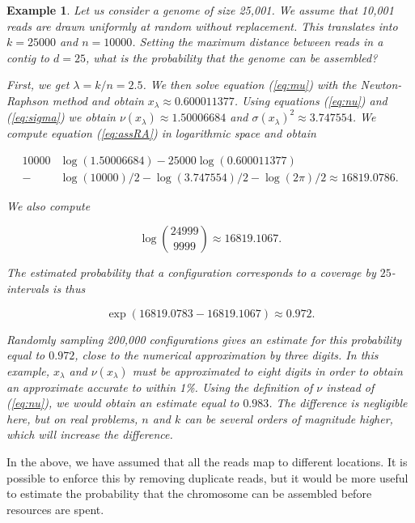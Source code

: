\documentclass{article}
\newtheorem{example}{Example}
\begin{document}
\begin{example}
Let us consider a genome of size 25,001. We assume that 10,001 reads are
drawn uniformly at random without replacement. This translates into
$k=25000$ and $n=10000$. Setting the maximum distance between reads in a
contig to $d=25$, what is the probability that the genome can be
assembled?

First, we get $\lambda = k/n = 2.5$. We then solve equation (\ref{eq:mu})
with the Newton-Raphson method and obtain $x_\lambda \approx 0.600011377$.
Using equations (\ref{eq:nu}) and (\ref{eq:sigma}) we obtain
$\nu(x_\lambda) \approx 1.50006684$ and $\sigma(x_\lambda)^2 \approx
3.747554$. We compute equation (\ref{eq:assRA}) in logarithmic space and
obtain

\begin{equation*}
\begin{split}
10000&\log(1.50006684) - 25000\log(0.600011377) \\
- &\log(10000)/2 - \log(3.747554)/2 - \log(2\pi)/2
\approx 16819.0786.
\end{split}
\end{equation*}

We also compute 

\begin{equation*}
\log { 24999 \choose 9999 } \approx 16819.1067.
\end{equation*}

The estimated probability that a configuration corresponds to a coverage
by $25$-intervals is thus

\begin{equation*}
\exp(16819.0783-16819.1067) \approx 0.972.
\end{equation*}

Randomly sampling 200,000 configurations gives an estimate for this
probability equal to $0.972$, close to the numerical approximation by
three digits. In this example, $x_\lambda$ and $\nu(x_\lambda)$ must be
approximated to eight digits in order to obtain an approximate accurate to
within 1\%. Using the definition of $\nu$ instead of (\ref{eq:nu}), we
would obtain an estimate equal to $0.983$. The difference is negligible
here, but on real problems, $n$ and $k$ can be several orders of magnitude
higher, which will increase the difference.
\end{example}

In the above, we have assumed that all the reads map to different
locations. It is possible to enforce this by removing duplicate reads, but
it would be more useful to estimate the probability that the chromosome
can be assembled before resources are spent. 
\end{document}
